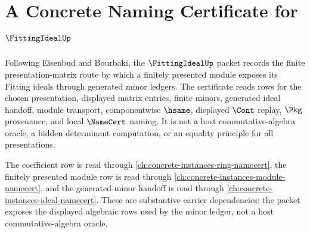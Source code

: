 \chapter{A Concrete Naming Certificate for $\FittingIdealUp$}
\label{ch:concrete-instances-fitting-ideal-namecert}

Following Eisenbud and Bourbaki, the $\FittingIdealUp$ packet records the finite presentation-matrix route by which a finitely presented module exposes its Fitting ideals through generated minor ledgers. The certificate reads rows for the chosen presentation, displayed matrix entries, finite minors, generated ideal handoff, module transport, componentwise $\hsame$, displayed $\Cont$ replay, $\Pkg$ provenance, and local $\NameCert$ naming. It is not a host commutative-algebra oracle, a hidden determinant computation, or an equality principle for all presentations.

The coefficient row is read through \autoref{ch:concrete-instances-ring-namecert}, the finitely presented module row is read through \autoref{ch:concrete-instances-module-namecert}, and the generated-minor handoff is read through \autoref{ch:concrete-instances-ideal-namecert}. These are substantive carrier dependencies: the packet exposes the displayed algebraic rows used by the minor ledger, not a host commutative-algebra oracle.

